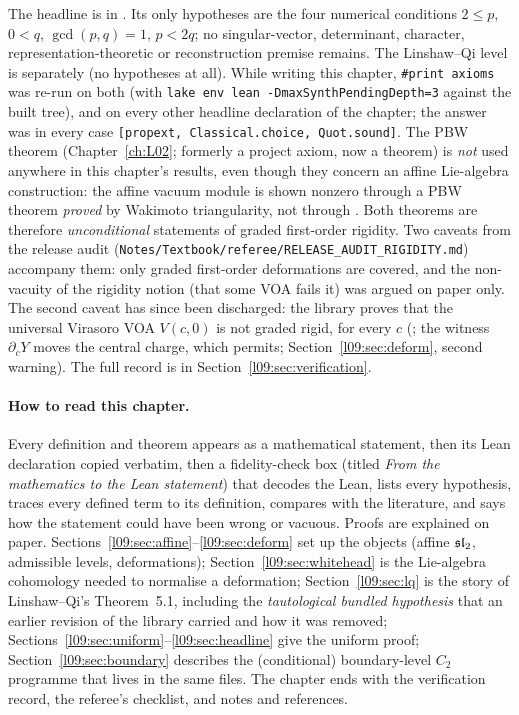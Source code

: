 \begin{status}
The headline is  in
. Its only hypotheses are the four numerical
conditions $2\le p$, $0<q$, $\gcd(p,q)=1$, $p<2q$; no singular-vector, determinant, character,
representation-theoretic or reconstruction premise remains. The Linshaw--Qi level is separately
 (no hypotheses at all). While writing this chapter,
\texttt{\#print axioms} was re-run on both (with \texttt{lake env lean -DmaxSynthPendingDepth=3}
against the built tree), and on every other headline declaration of the chapter; the answer was in
every case \texttt{[propext, Classical.choice, Quot.sound]}. The PBW theorem  (Chapter~\ref{ch:L02}; formerly a project axiom, now a theorem) is
\emph{not} used anywhere in this chapter's results, even though they concern an affine
Lie-algebra construction: the affine vacuum module is shown nonzero through a PBW theorem
\emph{proved} by Wakimoto triangularity, not through . Both theorems are therefore
\emph{unconditional} statements of graded first-order rigidity. Two caveats from the release audit
(\texttt{Notes/Textbook/referee/RELEASE\_AUDIT\_RIGIDITY.md}) accompany them: only graded first-order
deformations are covered, and the non-vacuity of the rigidity notion (that some VOA fails it) was argued on
paper only. The second caveat has since been discharged: the library proves that the universal Virasoro VOA
$V(c,0)$ is not graded rigid, for every $c$ (\allowbreak{}\allowbreak{}\allowbreak{}\allowbreak{}; the witness $\partial_cY$ moves the
central charge, which  permits; Section~\ref{l09:sec:deform}, second warning). The full record is in
Section~\ref{l09:sec:verification}.
\end{status}

\paragraph{How to read this chapter.}
Every definition and theorem appears as a mathematical statement, then its Lean declaration
copied verbatim, then a fidelity-check box (titled \emph{From the mathematics to the Lean
statement}) that decodes the Lean, lists every hypothesis, traces every defined term to its
definition, compares with the literature, and says how the statement could have been wrong or
vacuous. Proofs are explained on paper. Sections~\ref{l09:sec:affine}--\ref{l09:sec:deform} set up
the objects (affine $\mathfrak{sl}_2$, admissible levels, deformations); Section~\ref{l09:sec:whitehead} is
the Lie-algebra cohomology needed to normalise a deformation;
Section~\ref{l09:sec:lq} is the story of Linshaw--Qi's Theorem~5.1, including the
\emph{tautological bundled hypothesis} that an earlier revision of the library carried and how it
was removed; Sections~\ref{l09:sec:uniform}--\ref{l09:sec:headline} give the uniform proof;
Section~\ref{l09:sec:boundary} describes the (conditional) boundary-level $C_2$ programme that lives
in the same files. The chapter ends with the verification record, the referee's checklist, and
notes and references.

